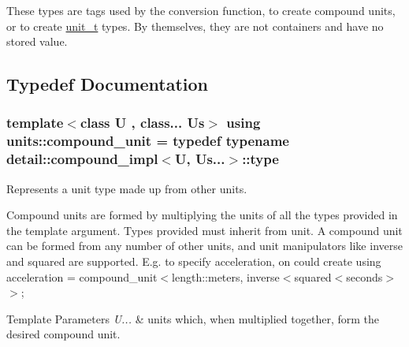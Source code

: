 These types are tags used by the conversion function, to create compound units, or to create {\ttfamily \hyperlink{classunits_1_1unit__t}{unit\+\_\+t}} types. By themselves, they are not containers and have no stored value. 

\subsection{Typedef Documentation}
\hypertarget{group___unit_types_ga9c3f6f077dc894620e1ed8358442a8f1}{}
\subsubsection[{compound\+\_\+unit}]{\setlength{\rightskip}{0pt plus 5cm}template$<$class U , class... Us$>$ using {\bf units\+::compound\+\_\+unit} = typedef typename detail\+::compound\+\_\+impl$<$U, Us...$>$\+::type}\label{group___unit_types_ga9c3f6f077dc894620e1ed8358442a8f1}


Represents a unit type made up from other units. 

Compound units are formed by multiplying the units of all the types provided in the template argument. Types provided must inherit from {\ttfamily unit}. A compound unit can be formed from any number of other units, and unit manipulators like {\ttfamily inverse} and {\ttfamily squared} are supported. E.\+g. to specify acceleration, on could create {\ttfamily using acceleration = compound\+\_\+unit$<$length\+::meters, inverse$<$squared$<$seconds$>$$>$;} 
\begin{DoxyTemplParams}{Template Parameters}
{\em U...} & units which, when multiplied together, form the desired compound unit. \\
\hline
\end{DoxyTemplParams}
